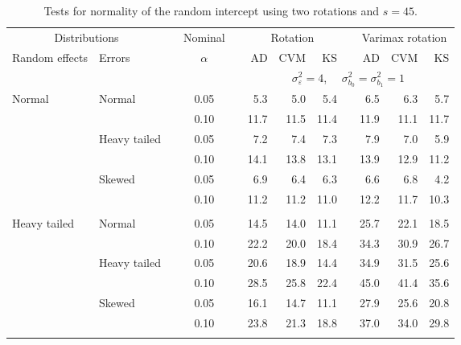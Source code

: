\begin{table}[ht]
\caption{\label{tab:simb0s45-alt}Tests for normality of the random intercept using two rotations and $s = 45$.}
\begin{scriptsize}
\begin{center}
\begin{tabular}{ll p{.1cm} c p{.1cm} rrr p{.1cm} rrr}
  \hline
  \multicolumn{2}{c}{Distributions}& & Nominal & &  \multicolumn{3}{c}{Rotation} & & \multicolumn{3}{c}{Varimax rotation} \\ \cline{1-2} \cline{6-8} \cline{10-12}   
  Random effects & Errors & & $\alpha$ & & AD & CVM & KS & & AD & CVM & KS \\ 
   \hline
& && && \multicolumn{7}{c}{$\sigma_{\varepsilon}^2 = 4$, \ \ $\sigma_{b_0}^2 = \sigma_{b_1}^2 = 1$} \\ \cline{6-12}
\rowcolor{gray!20}Normal       & Normal       && 0.05 &&   5.3 & 5.0 & 5.4 &   & 6.5 & 6.3 & 5.7 \\ 
\rowcolor{gray!20}             &              && 0.10 &&   11.7 & 11.5 & 11.4 &   & 11.9 & 11.1 & 11.7 \\ 
\rowcolor{gray!20}             & Heavy tailed && 0.05 &&   7.2 & 7.4 & 7.3 &   & 7.9 & 7.0 & 5.9 \\ 
\rowcolor{gray!20}             &              && 0.10 &&   14.1 & 13.8 & 13.1 &   & 13.9 & 12.9 & 11.2 \\ 
\rowcolor{gray!20}             & Skewed       && 0.05 &&   6.9 & 6.4 & 6.3 &   & 6.6 & 6.8 & 4.2 \\ 
\rowcolor{gray!20}             &              && 0.10 &&   11.2 & 11.2 & 11.0 &   & 12.2 & 11.7 & 10.3 \\ 
&&&&&&&&&&&\\
Heavy tailed & Normal       && 0.05 &&   14.5 & 14.0 & 11.1 &   & 25.7 & 22.1 & 18.5 \\ 
             &              && 0.10 &&   22.2 & 20.0 & 18.4 &   & 34.3 & 30.9 & 26.7 \\ 
             & Heavy tailed && 0.05 &&   20.6 & 18.9 & 14.4 &   & 34.9 & 31.5 & 25.6 \\ 
             &              && 0.10 &&   28.5 & 25.8 & 22.4 &   & 45.0 & 41.4 & 35.6 \\ 
             & Skewed       && 0.05 &&   16.1 & 14.7 & 11.1 &   & 27.9 & 25.6 & 20.8 \\ 
             &              && 0.10 &&   23.8 & 21.3 & 18.8 &   & 37.0 & 34.0 & 29.8 \\ 
&&&&&&&&&&&\\

\end{tabular}
\end{center}
\end{scriptsize}
\end{table}
